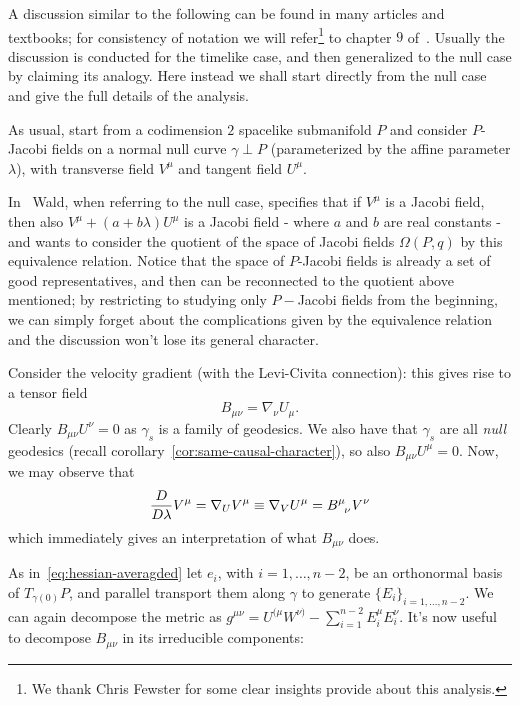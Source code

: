 	A discussion similar to the following can be found in many articles and textbooks; for consistency of notation we will refer\footnote{We thank Chris Fewster for some clear insights provide about this analysis.} to chapter \(9\) of~\cite{wald2010general}.
	Usually the discussion is conducted for the timelike case, and then generalized to the null case by claiming its analogy. Here instead we shall start directly from the null case and give the full details of the analysis.
	
	As usual, start from a codimension \(2\) spacelike submanifold \(P\) and consider \(P\)-Jacobi fields on a normal null curve \(\gamma \perp P\) (parameterized by the affine parameter \(\lambda\)), with transverse field \(V^{\mu}\) and tangent field \(U^{\mu}\).
	\begin{remark}
		In~\cite{wald2010general} Wald, when referring to the null case, specifies that if \(V^{\mu}\) is a Jacobi field, then also \(V^{\mu} + (a + b\lambda) U^{\mu}\) is a Jacobi field - where \(a\) and \(b\) are real constants - and wants to consider the quotient of the space of Jacobi fields \(\Omega (P,q)\) by this equivalence relation. Notice that the space of \(P\)-Jacobi fields is already a set of good representatives, and then can be reconnected to the quotient above mentioned; by restricting to studying only \(P-\)Jacobi fields from the beginning, we can simply forget about the complications given by the equivalence relation and the discussion won't lose its general character.
	\end{remark}

	Consider the velocity gradient (with the Levi-Civita connection): this gives rise to a tensor field
	\[
	B_{\mu\nu} = \nabla_{\nu}U_{\mu}.
	\]
	Clearly \(B_{\mu\nu}U^{\nu} = 0\) as \(\gamma_s\) is a family of geodesics. We also have that \(\gamma_s\) are all \emph{null} geodesics (recall corollary~\ref{cor:same-causal-character}), so also \(B_{\mu\nu}U^{\mu} = 0\). Now, we may observe that
	\[
	\frac{D}{D\lambda} V^{\mu} = \nabla_U V^{\mu} \equiv \nabla_V U^{\mu} = B\indices{^{\mu}_{\nu}} V^{\nu}
	\]
	which immediately gives an interpretation of what \(B_{\mu\nu}\) does.
	
	As in~\ref{eq:hessian-averagded} let \(e_i\), with \(i = 1, \ldots, n - 2\), be an orthonormal basis of \(T_{\gamma(0)}P\), and parallel transport them along \(\gamma\) to generate \(\{E_i\}_{i = 1, \ldots, n-2}\). We can again decompose the metric as \(g^{\mu\nu} = U^{(\mu}W^{\nu)} - \sum_{i=1}^{n - 2}E_i^{\mu}E_i^{\nu}\). It's now useful to decompose \(B_{\mu\nu}\) in its irreducible components:
	
